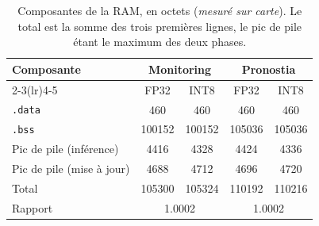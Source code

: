 \begin{table}[htbp]
\centering
\caption{Composantes de la RAM, en octets (\emph{mesuré sur carte}). Le total est la somme des trois premières lignes, le pic de pile étant le maximum des deux phases.}
\label{tab:annex-ram}
\begin{tabular}{lcccc}
\toprule
Composante & \multicolumn{2}{c}{Monitoring} & \multicolumn{2}{c}{Pronostia} \\
\cmidrule(lr){2-3}\cmidrule(lr){4-5}
 & FP32 & INT8 & FP32 & INT8 \\
\midrule
\texttt{.data} & \num{460} & \num{460} & \num{460} & \num{460} \\
\texttt{.bss} & \num{100152} & \num{100152} & \num{105036} & \num{105036} \\
Pic de pile (inférence) & \num{4416} & \num{4328} & \num{4424} & \num{4336} \\
Pic de pile (mise à jour) & \num{4688} & \num{4712} & \num{4696} & \num{4720} \\
Total & \num{105300} & \num{105324} & \num{110192} & \num{110216} \\
\midrule
Rapport & \multicolumn{2}{c}{\num{1.0002}} & \multicolumn{2}{c}{\num{1.0002}} \\
\bottomrule
\end{tabular}
\end{table}
